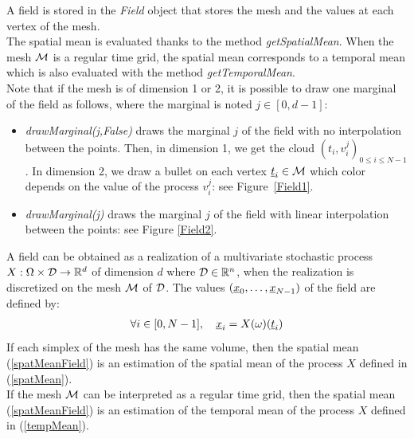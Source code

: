 A field is stored in the \emph{Field} object that stores the mesh and the  values at each vertex of the mesh.\\

The spatial mean is evaluated thanks to the method \emph{getSpatialMean}. When the mesh ${\mathcal M}$ is a regular time grid, the spatial mean corresponds to a temporal mean which is also evaluated with the method \emph{getTemporalMean}.\\

Note that if the mesh is of dimension 1 or 2, it is possible to draw one marginal of the field as follows, where the marginal is noted $j\in[0,d-1]$:
\begin{itemize}
\item \emph{drawMarginal(j,False)} draws the marginal $j$ of the field with no interpolation between the points. Then, in dimension 1, we get the cloud $(t_i, v_i^j)_{0 \leq i \leq N-1}$. In dimension 2, we draw a bullet on each vertex ${\underline{t}}_i\in {\mathcal M}$  which color depends on the value of the process $v_i^j$: see Figure~\ref{Field1}.
\item \emph{drawMarginal(j)} draws the marginal $j$ of the field with linear interpolation between the points: see Figure \ref{Field2}.
\end{itemize}




A field can be obtained as a realization of a multivariate stochastic process  $X: \Omega \times {\mathcal D} \rightarrow {\mathbb R}^d$   of dimension $d$ where ${\mathcal D} \in {\mathbb R}^n$, when the realization is discretized on the mesh ${\mathcal M}$ of ${\mathcal D}$. The  values $({\underline{x}}_0, \dots, {\underline{x}}_{N-1})$ of the field are defined by:
\begin{align}
  \forall i \in [0, N-1],\quad   {\underline{x}}_i= X(\omega)({\underline{t}}_i)
\end{align}
If each simplex of the mesh has the same volume, then the spatial mean (\ref{spatMeanField}) is an estimation of the spatial mean of the process $X$ defined in (\ref{spatMean}). \\

If the mesh ${\mathcal M}$ can be interpreted as a regular time grid, then the spatial mean (\ref{spatMeanField}) is an estimation of the temporal mean of the process $X$ defined in (\ref{tempMean}). \\



